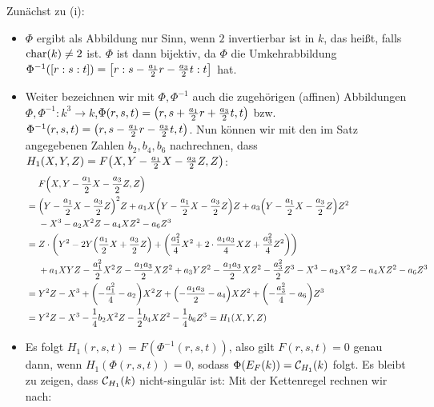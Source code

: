\begin{bew}
	Zunächst zu (i): \begin{itemize}
		\item $\Phi$ ergibt als Abbildung nur Sinn, wenn $2$ invertierbar ist in $k$, das heißt, falls $\Char(k) \neq 2$ ist. $\Phi$ ist dann bijektiv, da $\Phi$ die Umkehrabbildung $\Phi^{-1}([r:s:t]) = \benbrace*{r : s - \frac{a_1}{2}r - \frac{a_3}{2}t : t}$ hat.
		\item Weiter bezeichnen wir mit $\Phi, \Phi^{-1}$ auch die zugehörigen (affinen) Abbildungen $\Phi, \Phi^{-1}\colon k^3 \longrightarrow k$,\linebreak $\Phi(r,s,t) = \enbrace*{r,s+ \frac{a_1}{2}r + \frac{a_3}{2}t, t}$ bzw. $\Phi^{-1}(r,s,t) = \enbrace*{r,s - \frac{a_1}{2}r - \frac{a_3}{2}t,t}$. Nun können wir mit den im Satz angegebenen Zahlen $b_2,b_4,b_6$ nachrechnen, dass $H_1(X,Y,Z) = F\enbrace*{X,Y - \frac{a_1}{2}X - \frac{a_3}{2}Z,Z}$:
		\begin{equation}
		\begin{aligned}
			& \quad \ F\enbrace*{X,Y-\frac{a_1}{2}X-\frac{a_3}{2}Z,Z} \\
			&= \enbrace*{Y- \frac{a_1}{2} X - \frac{a_3}{2}Z}^2 Z + a_1 X \enbrace*{Y - \frac{a_1}{2} X - \frac{a_3}{2}Z}Z + a_3 \enbrace*{Y - \frac{a_1}{2} X - \frac{a_3}{2} Z}Z^2 \\
			& \quad \ - X^3 - a_2X^2Z - a_4 XZ^2 - a_6Z^3 \\
			&= Z \cdot \enbrace*{Y^2 - 2Y \enbrace*{\frac{a_1}{2}X + \frac{a_3}{2} Z} + \enbrace*{\frac{a_1^2}{4} X^2 + 2 \cdot \frac{a_1 a_3}{4} XZ + \frac{a_3^2}{4} Z^2}} \\
			& \quad \ + a_1XYZ - \frac{a_1^2}{2} X^2 Z - \frac{a_1 a_3}{2} XZ^2 + a_3 YZ^2 - \frac{a_1 a_3}{2} XZ^2 - \frac{a_3^2}{2} Z^3 - X^3 - a_2 X^2 Z - a_4 XZ^2 - a_6Z^3 \\
			&= Y^2 Z - X^3 + \enbrace*{-\frac{a_1^2}{4} - a_2} X^2 Z + \enbrace*{- \frac{a_1 a_3}{2} - a_4} XZ^2 + \enbrace*{- \frac{a_3^2}{4} - a_6} Z^3 \\
			&= Y^2 Z - X^3 - \frac{1}{4} b_2 X^2 Z - \frac{1}{2} b_4 XZ^2 - \frac{1}{4} b_6 Z^3 = H_1(X,Y,Z)
		\end{aligned}
		\end{equation}
		\item Es folgt $H_1(r,s,t) = F(\Phi^{-1}(r,s,t))$, also gilt $F(r,s,t) = 0$ genau dann, wenn $H_1(\Phi(r,s,t))=0$, sodass $\Phi (E_F(k)) = \cc_{H_1}(k)$ folgt. Es bleibt zu zeigen, dass $\cc_{H_1}(k)$ nicht-singulär ist: Mit der Kettenregel rechnen wir nach:

\end{itemize}
\end{bew}
